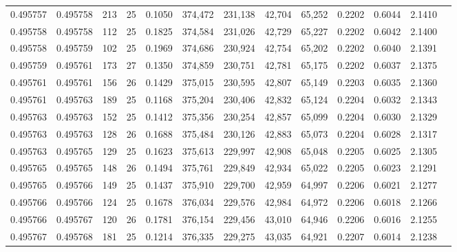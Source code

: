 \begin{tabular}{rrrrrrrrrrrrr}
0.495757 & 0.495758 & 213 &  25 &                                     0.1050 & 374,472 & 231,138 &  42,704 &  65,252 & 0.2202 & 0.6044 & 2.1410 \\
0.495758 & 0.495758 & 112 &  25 &                                     0.1825 & 374,584 & 231,026 &  42,729 &  65,227 & 0.2202 & 0.6042 & 2.1400 \\
0.495758 & 0.495759 & 102 &  25 &                                     0.1969 & 374,686 & 230,924 &  42,754 &  65,202 & 0.2202 & 0.6040 & 2.1391 \\
0.495759 & 0.495761 & 173 &  27 &                                     0.1350 & 374,859 & 230,751 &  42,781 &  65,175 & 0.2202 & 0.6037 & 2.1375 \\
0.495761 & 0.495761 & 156 &  26 &                                     0.1429 & 375,015 & 230,595 &  42,807 &  65,149 & 0.2203 & 0.6035 & 2.1360 \\
0.495761 & 0.495763 & 189 &  25 &                                     0.1168 & 375,204 & 230,406 &  42,832 &  65,124 & 0.2204 & 0.6032 & 2.1343 \\
0.495763 & 0.495763 & 152 &  25 &                                     0.1412 & 375,356 & 230,254 &  42,857 &  65,099 & 0.2204 & 0.6030 & 2.1329 \\
0.495763 & 0.495763 & 128 &  26 &                                     0.1688 & 375,484 & 230,126 &  42,883 &  65,073 & 0.2204 & 0.6028 & 2.1317 \\
0.495763 & 0.495765 & 129 &  25 &                                     0.1623 & 375,613 & 229,997 &  42,908 &  65,048 & 0.2205 & 0.6025 & 2.1305 \\
0.495765 & 0.495765 & 148 &  26 &                                     0.1494 & 375,761 & 229,849 &  42,934 &  65,022 & 0.2205 & 0.6023 & 2.1291 \\
0.495765 & 0.495766 & 149 &  25 &                                     0.1437 & 375,910 & 229,700 &  42,959 &  64,997 & 0.2206 & 0.6021 & 2.1277 \\
0.495766 & 0.495766 & 124 &  25 &                                     0.1678 & 376,034 & 229,576 &  42,984 &  64,972 & 0.2206 & 0.6018 & 2.1266 \\
0.495766 & 0.495767 & 120 &  26 &                                     0.1781 & 376,154 & 229,456 &  43,010 &  64,946 & 0.2206 & 0.6016 & 2.1255 \\
0.495767 & 0.495768 & 181 &  25 &                                     0.1214 & 376,335 & 229,275 &  43,035 &  64,921 & 0.2207 & 0.6014 & 2.1238 \\

\end{tabular}
